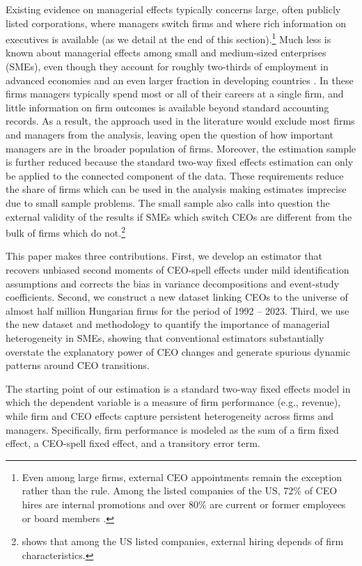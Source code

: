 \documentclass[sigconf,nonacm]{acmart}
\begin{document}
Existing evidence on managerial effects typically concerns large, often publicly listed corporations, where managers switch firms and where rich information on executives is available (as we detail at the end of this section).\footnote{Even among large firms, external CEO appointments remain the exception rather than the rule. Among the listed companies of the US, 72\% of CEO hires are internal promotions and over 80\% are current or former employees or board members \citep{cziraki2022market}.} Much less is known about managerial effects among small and medium-sized enterprises (SMEs), even though they account for roughly two-thirds of employment in advanced economies and an even larger fraction in developing countries \citep{MadgavkarEtAl2024_MSMEs}. In these firms managers typically spend most or all of their careers at a single firm, and little information on firm outcomes is available beyond standard accounting records. As a result, the approach used in the literature would exclude most firms and managers from the analysis, leaving open the question of how important managers are in the broader population of firms. Moreover, the estimation sample is further reduced because the standard two-way fixed effects estimation can only be applied to the connected component of the data. These requirements reduce the share of firms which can be used in the analysis making estimates imprecise due to small sample problems. The small sample also calls into question the external validity of the results if SMEs which switch CEOs are different from the bulk of firms which do not.\footnote{\cite{cziraki2022market} shows that among the US listed companies, external hiring depends of firm characteristics.}

This paper makes three contributions. First, we develop an estimator that recovers unbiased second moments of CEO-spell effects under mild identification assumptions and corrects the bias in variance decompositions and event-study coefficients. Second, we construct a new dataset linking CEOs to the universe of almost half million Hungarian firms for the period of 1992 -- 2023. Third, we use the new dataset and methodology to quantify the importance of managerial heterogeneity in SMEs, showing that conventional estimators substantially overstate the explanatory power of CEO changes and generate spurious dynamic patterns around CEO transitions. 

The starting point of our estimation is a standard two-way fixed effects model in which the dependent variable is a measure of firm performance (e.g., revenue), while firm and CEO effects capture persistent heterogeneity across firms and managers. Specifically, firm performance is modeled as the sum of a firm fixed effect, a CEO-spell fixed effect, and a transitory error term.
\end{document}

